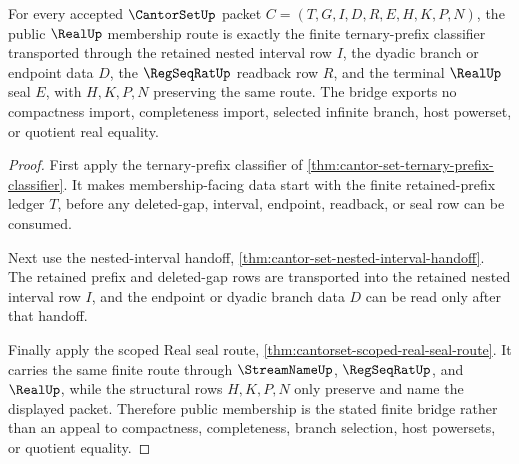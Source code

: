 \begin{theorem}
\label{thm:cantor-set-public-real-membership-bridge}
For every accepted $\CantorSetUp$ packet $C=(T,G,I,D,R,E,H,K,P,N)$, the public $\RealUp$ membership route is exactly the finite ternary-prefix classifier transported through the retained nested interval row $I$, the dyadic branch or endpoint data $D$, the $\RegSeqRatUp$ readback row $R$, and the terminal $\RealUp$ seal $E$, with $H,K,P,N$ preserving the same route. The bridge exports no compactness import, completeness import, selected infinite branch, host powerset, or quotient real equality.
\end{theorem}
\begin{proof}
First apply the ternary-prefix classifier of \autoref{thm:cantor-set-ternary-prefix-classifier}. It makes membership-facing data start with the finite retained-prefix ledger $T$, before any deleted-gap, interval, endpoint, readback, or seal row can be consumed.

Next use the nested-interval handoff, \autoref{thm:cantor-set-nested-interval-handoff}. The retained prefix and deleted-gap rows are transported into the retained nested interval row $I$, and the endpoint or dyadic branch data $D$ can be read only after that handoff.

Finally apply the scoped Real seal route, \autoref{thm:cantorset-scoped-real-seal-route}. It carries the same finite route through $\StreamNameUp$, $\RegSeqRatUp$, and $\RealUp$, while the structural rows $H,K,P,N$ only preserve and name the displayed packet. Therefore public membership is the stated finite bridge rather than an appeal to compactness, completeness, branch selection, host powersets, or quotient equality.
\end{proof}



